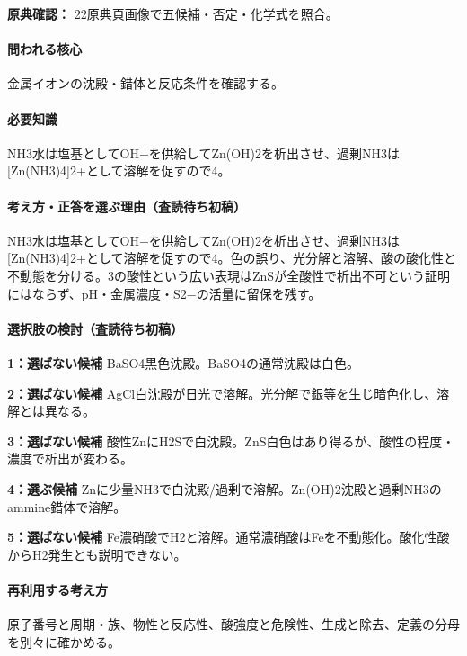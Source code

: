 \noindent\textbf{原典確認：} 22原典頁画像で五候補・否定・化学式を照合。\par

\paragraph{問われる核心} 金属イオンの沈殿・錯体と反応条件を確認する。

\paragraph{必要知識} NH3水は塩基としてOH−を供給してZn(OH)2を析出させ、過剰NH3は[Zn(NH3)4]2+として溶解を促すので4。

\paragraph{考え方・正答を選ぶ理由（査読待ち初稿）} NH3水は塩基としてOH−を供給してZn(OH)2を析出させ、過剰NH3は[Zn(NH3)4]2+として溶解を促すので4。色の誤り、光分解と溶解、酸の酸化性と不動態を分ける。3の酸性という広い表現はZnSが全酸性で析出不可という証明にはならず、pH・金属濃度・S2−の活量に留保を残す。

\paragraph{選択肢の検討（査読待ち初稿）}\mbox{}\par

\noindent\textbf{1：選ばない候補} BaSO4黒色沈殿。BaSO4の通常沈殿は白色。\par

\noindent\textbf{2：選ばない候補} AgCl白沈殿が日光で溶解。光分解で銀等を生じ暗色化し、溶解とは異なる。\par

\noindent\textbf{3：選ばない候補} 酸性ZnにH2Sで白沈殿。ZnS白色はあり得るが、酸性の程度・濃度で析出が変わる。\par

\noindent\textbf{4：選ぶ候補} Znに少量NH3で白沈殿/過剰で溶解。Zn(OH)2沈殿と過剰NH3のammine錯体で溶解。\par

\noindent\textbf{5：選ばない候補} Fe濃硝酸でH2と溶解。通常濃硝酸はFeを不動態化。酸化性酸からH2発生とも説明できない。\par

\paragraph{再利用する考え方} 原子番号と周期・族、物性と反応性、酸強度と危険性、生成と除去、定義の分母を別々に確かめる。

